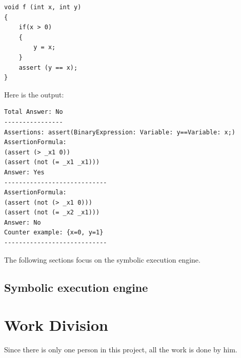 \documentclass[12pt,a4paper]{article}
\begin{document}



\begin{lstlisting}  
void f (int x, int y)
{
    if(x > 0)
    {
        y = x;
    }
    assert (y == x);
}
\end{lstlisting}

Here is the output:


\begin{lstlisting} 
Total Answer: No
----------------
Assertions: assert(BinaryExpression: Variable: y==Variable: x;)
AssertionFormula:
(assert (> _x1 0))
(assert (not (= _x1 _x1)))
Answer: Yes
----------------------------
AssertionFormula:
(assert (not (> _x1 0)))
(assert (not (= _x2 _x1)))
Answer: No
Counter example: {x=0, y=1}
----------------------------

\end{lstlisting} 

The following sections focus on the symbolic execution engine. 

\subsection{Symbolic execution engine} \label{sec:execution}


\section{Work Division} 

Since there is only one person in this project, all the work is done by him. 




\end{document}
